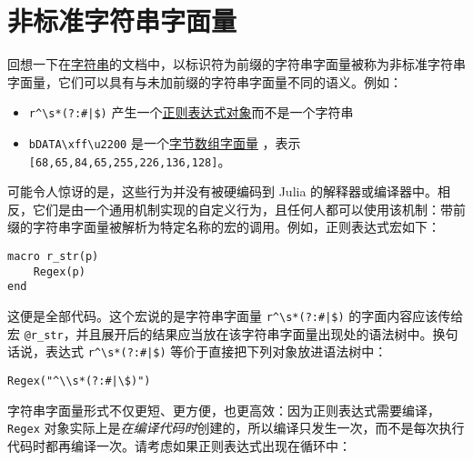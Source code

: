 \hypertarget{978710492036418407}{}


\section{非标准字符串字面量}



回想一下在\hyperlink{6548320458095485939}{字符串}的文档中，以标识符为前缀的字符串字面量被称为非标准字符串字面量，它们可以具有与未加前缀的字符串字面量不同的语义。例如：



\begin{itemize}
\item \texttt{r{\textquotedbl}{\textasciicircum}{\textbackslash}s*(?:\#|\$){\textquotedbl}} 产生一个\hyperlink{17292082084708718801}{正则表达式对象}而不是一个字符串


\item \texttt{b{\textquotedbl}DATA{\textbackslash}xff{\textbackslash}u2200{\textquotedbl}} 是一个\hyperlink{1529513445769909572}{字节数组字面量} ，表示\texttt{[68,65,84,65,255,226,136,128]}。

\end{itemize}


可能令人惊讶的是，这些行为并没有被硬编码到 Julia 的解释器或编译器中。相反，它们是由一个通用机制实现的自定义行为，且任何人都可以使用该机制：带前缀的字符串字面量被解析为特定名称的宏的调用。例如，正则表达式宏如下：




\begin{verbatim}
macro r_str(p)
    Regex(p)
end
\end{verbatim}



这便是全部代码。这个宏说的是字符串字面量 \texttt{r{\textquotedbl}{\textasciicircum}{\textbackslash}s*(?:\#|\$){\textquotedbl}} 的字面内容应该传给宏 \texttt{@r\_str}，并且展开后的结果应当放在该字符串字面量出现处的语法树中。换句话说，表达式 \texttt{r{\textquotedbl}{\textasciicircum}{\textbackslash}s*(?:\#|\$){\textquotedbl}} 等价于直接把下列对象放进语法树中：




\begin{verbatim}
Regex("^\\s*(?:#|\$)")
\end{verbatim}



字符串字面量形式不仅更短、更方便，也更高效：因为正则表达式需要编译，\texttt{Regex} 对象实际上是\emph{在编译代码时}创建的，所以编译只发生一次，而不是每次执行代码时都再编译一次。请考虑如果正则表达式出现在循环中：




